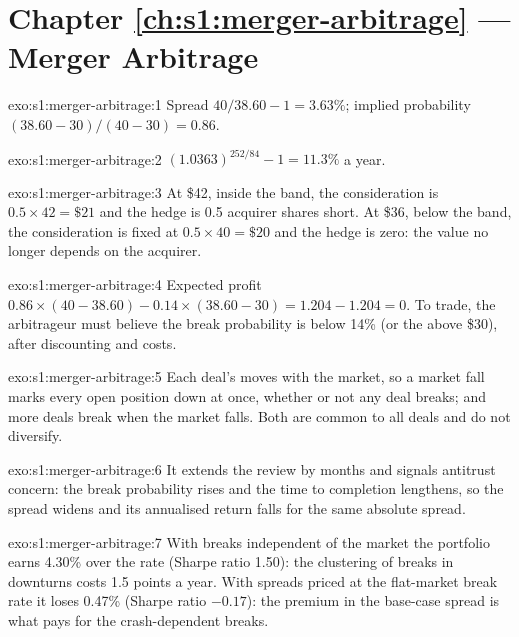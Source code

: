 \section*{Chapter \ref{ch:s1:merger-arbitrage} --- Merger Arbitrage}

\begin{solution}{exo:s1:merger-arbitrage:1}
Spread $40/38.60 - 1 = 3.63\%$; implied probability $(38.60 - 30)/(40 - 30) = 0.86$.
\end{solution}

\begin{solution}{exo:s1:merger-arbitrage:2}
$(1.0363)^{252/84} - 1 = 11.3\%$ a year.
\end{solution}

\begin{solution}{exo:s1:merger-arbitrage:3}
At \$42, inside the band, the consideration is $0.5 \times 42 = \$21$ and the hedge is 0.5 acquirer shares short. At \$36, below the band, the consideration is
fixed at $0.5 \times 40 = \$20$ and the hedge is zero: the value no longer depends on the acquirer.
\end{solution}

\begin{solution}{exo:s1:merger-arbitrage:4}
Expected profit $0.86 \times (40 - 38.60) - 0.14 \times (38.60 - 30) = 1.204 - 1.204 = 0$. To trade, the arbitrageur must believe the break probability is below
14\% (or the  above \$30), after discounting and costs.
\end{solution}

\begin{solution}{exo:s1:merger-arbitrage:5}
Each deal's  moves with the market, so a market fall marks every open position down at once, whether or not any deal breaks; and more deals break
when the market falls. Both are common to all deals and do not diversify.
\end{solution}

\begin{solution}{exo:s1:merger-arbitrage:6}
It extends the review by months and signals antitrust concern: the break probability rises and the time to completion lengthens, so the spread widens and its
annualised return falls for the same absolute spread.
\end{solution}

\begin{solution}{exo:s1:merger-arbitrage:7}
With breaks independent of the market the portfolio earns 4.30\% over the rate (Sharpe ratio 1.50): the clustering of breaks in downturns costs 1.5 points a
year. With spreads priced at the flat-market break rate it loses 0.47\% (Sharpe ratio $-0.17$): the premium in the base-case spread is what pays for the
crash-dependent breaks.
\end{solution}

